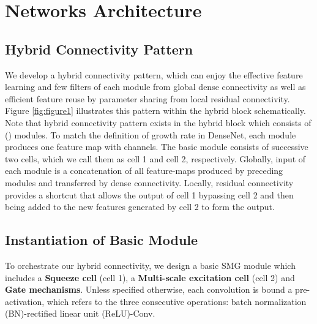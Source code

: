 \documentclass[letterpaper]{article}
\begin{document}
 	\section{Networks Architecture}
 	\subsection{Hybrid Connectivity Pattern}
 	We develop a hybrid connectivity pattern, which can enjoy the effective feature learning and few filters of each module from global dense connectivity as well as efficient feature reuse by parameter sharing from local residual connectivity. Figure \ref{fig:figure1} illustrates this pattern within the hybrid block schematically. Note that hybrid connectivity pattern exists in the hybrid block which consists of  () modules. To match the definition of growth rate in DenseNet, each module produces one feature map with  channels. The basic module consists of successive two cells, which we call them as cell 1 and cell 2, respectively. Globally, input of each module is a concatenation of all feature-maps produced by preceding modules and transferred by dense connectivity. Locally, residual connectivity provides a shortcut that allows the output of cell 1 bypassing cell 2 and then being added to the new features generated by cell 2 to form the output.
 	
 	\subsection{Instantiation of Basic Module}
 	To orchestrate our hybrid connectivity, we design a basic SMG module which includes a \textbf{Squeeze cell} (cell 1), a \textbf{Multi-scale excitation cell} (cell 2) and \textbf{Gate mechanisms}. Unless specified otherwise, each convolution is bound a pre-activation, which refers to the three consecutive operations: batch normalization (BN)-rectified linear unit (ReLU)-Conv.
 
\end{document}
